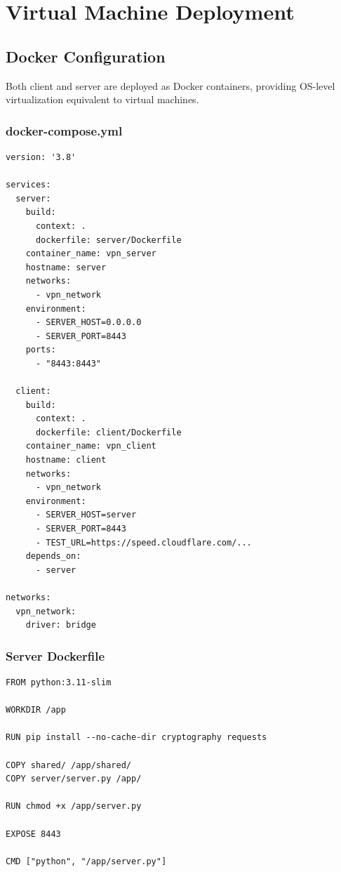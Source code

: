 \documentclass[12pt,a4paper]{article}
\begin{document}
\section{Virtual Machine Deployment}

\subsection{Docker Configuration}

Both client and server are deployed as Docker containers, providing OS-level virtualization equivalent to virtual machines.

\subsubsection{docker-compose.yml}

\begin{lstlisting}[style=bashstyle, caption={Docker Compose configuration}]
version: '3.8'

services:
  server:
    build:
      context: .
      dockerfile: server/Dockerfile
    container_name: vpn_server
    hostname: server
    networks:
      - vpn_network
    environment:
      - SERVER_HOST=0.0.0.0
      - SERVER_PORT=8443
    ports:
      - "8443:8443"

  client:
    build:
      context: .
      dockerfile: client/Dockerfile
    container_name: vpn_client
    hostname: client
    networks:
      - vpn_network
    environment:
      - SERVER_HOST=server
      - SERVER_PORT=8443
      - TEST_URL=https://speed.cloudflare.com/...
    depends_on:
      - server

networks:
  vpn_network:
    driver: bridge
\end{lstlisting}

\subsubsection{Server Dockerfile}

\begin{lstlisting}[style=bashstyle, caption={Server container configuration}]
FROM python:3.11-slim

WORKDIR /app

RUN pip install --no-cache-dir cryptography requests

COPY shared/ /app/shared/
COPY server/server.py /app/

RUN chmod +x /app/server.py

EXPOSE 8443

CMD ["python", "/app/server.py"]
\end{lstlisting}
\end{document}
